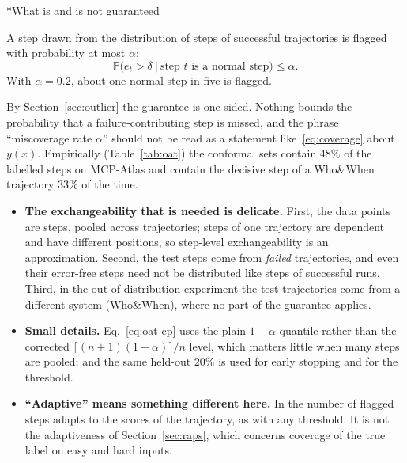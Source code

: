\documentclass[11pt]{article}
\makeatletter
\theoremstyle{definition}
\renewcommand\subsection{\@startsection{subsection}{2}{\z@}{-3.25ex\@plus -1ex \@minus -.2ex}{1.5ex \@plus .2ex}{\normalfont\large\bfseries\color{secblue}}}
\newcommand{\PP}{\mathbb{P}}
\makeatother
\begin{document}
\subsection*{What is and is not guaranteed}
\begin{okbox}
A step drawn from the distribution of steps of successful trajectories is flagged with probability at most $\alpha$:
\[\PP\big(e_t>\delta\ \big|\ \text{step }t\text{ is a normal step}\big)\le\alpha .\]
With $\alpha=0.2$, about one normal step in five is flagged.
\end{okbox}
\begin{nobox}
By Section~\ref{sec:outlier} the guarantee is one-sided. Nothing bounds the probability that a failure-contributing step is missed, and the phrase ``miscoverage rate $\alpha$'' should not be read as a statement like~\eqref{eq:coverage} about $y(x)$. Empirically (Table~\ref{tab:oat}) the conformal sets contain $48\%$ of the labelled steps on MCP-Atlas and contain the decisive step of a Who\&When trajectory $33\%$ of the time.
\end{nobox}
\begin{oursbox}
\begin{itemize}[leftmargin=1.5em]
\item \textbf{The exchangeability that is needed is delicate.} First, the data points are steps, pooled across trajectories; steps of one trajectory are dependent and have different positions, so step-level exchangeability is an approximation. Second, the test steps come from \emph{failed} trajectories, and even their error-free steps need not be distributed like steps of successful runs. Third, in the out-of-distribution experiment the test trajectories come from a different system (Who\&When), where no part of the guarantee applies.
\item \textbf{Small details.} Eq.~\eqref{eq:oat-cp} uses the plain $1-\alpha$ quantile rather than the corrected $\lceil(n+1)(1-\alpha)\rceil/n$ level, which matters little when many steps are pooled; and the same held-out $20\%$ is used for early stopping and for the threshold.
\item \textbf{``Adaptive'' means something different here.} In  the number of flagged steps adapts to the scores of the trajectory, as with any threshold. It is not the adaptiveness of Section~\ref{sec:raps}, which concerns coverage of the true label on easy and hard inputs.
\end{itemize}
\end{oursbox}
\end{document}
